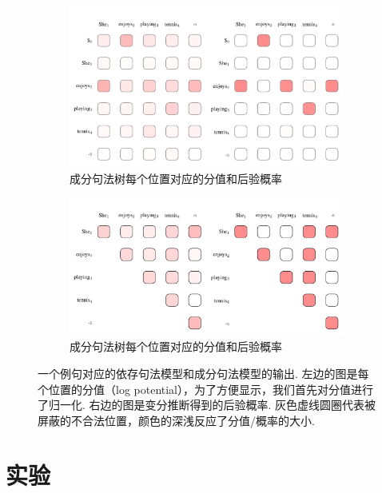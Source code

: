 \begin{figure}[tb]
    \centering
    \begin{subfigure}[b]{0.9\textwidth}
        \centering
        \includegraphics[scale=0.75]{figures/dep-probs.pdf}
        \caption{成分句法树每个位置对应的分值和后验概率}
        \label{fig:con-factors}
    \end{subfigure}
    \begin{subfigure}[b]{0.9\textwidth}
        \centering
        \includegraphics[scale=0.75]{figures/con-probs.pdf}
        \caption{成分句法树每个位置对应的分值和后验概率}
        \label{fig:dep-factors}
    \end{subfigure}
    \caption{一个例句对应的依存句法模型和成分句法模型的输出. 左边的图是每个位置的分值（log potential），为了方便显示，我们首先对分值进行了归一化.
        右边的图是变分推断得到的后验概率. 灰色虚线圆圈代表被屏蔽的不合法位置，颜色的深浅反应了分值/概率的大小.}

    \label{fig:dep-vi-factors}
\end{figure}

\section{实验}\label{sec:vi-exp}

